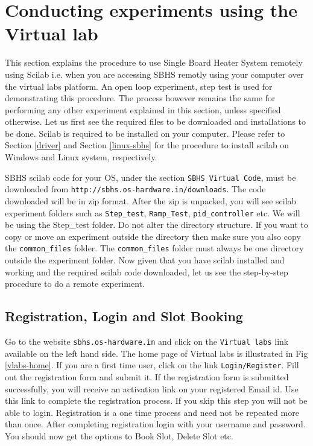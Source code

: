 \section{Conducting experiments using the Virtual lab}\label{vlabsexpt}

This section explains the procedure to use Single Board Heater System remotely using Scilab i.e. when you are accessing SBHS remotly using your computer over the virtual labs platform. An open loop experiment, step test is used for demonstrating this procedure. The process however remains the same for performing any other experiment explained in this section, unless specified otherwise. Let us first see the required files to be downloaded and installations to be done. Scilab is required to be installed on your computer. Please refer to Section \ref{driver} and Section \ref{linux-sbhs} for the procedure to install scilab on Windows and Linux system, respectively.

SBHS scilab code for your OS,  under the section {\tt SBHS Virtual Code}, must be downloaded from {\tt http://sbhs.os-hardware.in/downloads}. The code downloaded will be in zip format. After the zip is unpacked, you will see scilab experiment folders such as {\tt Step\_test}, {\tt Ramp\_Test}, {\tt pid\_controller} etc. We will be using the {Step\_test} folder. Do not alter the directory structure. If you want to copy or move an experiment outside the directory then make sure you also copy the {\tt common\_files} folder. The {\tt common\_files} folder must always be one directory outside the experiment folder. Now given that you have scilab installed and working and the required scilab code downloaded, let us see the step-by-step procedure to do a remote experiment.

\subsection{Registration, Login and Slot Booking}\label{regAndslot}
 Go to the website {\tt sbhs.os-hardware.in} and click on the {\tt Virtual labs} link available on the left hand side. The home page of Virtual labs is illustrated in Fig \ref{vlabs-home}. If you are a first time user, click on the link {\tt Login/Register}. Fill out the registration form and submit it. If the registration form is submitted successfully, you will receive an activation link on your registered Email id. Use this link to complete the registration process. If you skip this step you will not be able to login. Registration is a one time process and need not be repeated more than once. After completing registration login with your username and password. You should now get the options to Book Slot, Delete Slot etc. 

